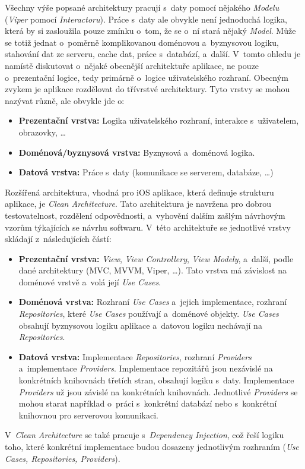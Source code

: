 Všechny výše popsané architektury pracují s~daty pomocí nějakého \emph{Modelu} (\emph{Viper} pomocí \emph{Interactoru}). Práce s~daty ale obvykle není jednoduchá logika, která by si zasloužila pouze zmínku o~tom, že se o~ní stará nějaký \emph{Model}. Může se totiž jednat o~poměrně komplikovanou doménovou a~byznysovou logiku, stahování dat ze serveru, cache dat, práce s~databází, a~další. V~tomto ohledu je namístě diskutovat o~nějaké obecnější architektuře aplikace, ne pouze o~prezentační logice, tedy primárně o~logice uživatelského rozhraní. Obecným zvykem je aplikace rozdělovat do třívrstvé architektury. Tyto vrstvy se mohou nazývat různě, ale obvykle jde o:
\begin{itemize}
\item\textbf{Prezentační vrstva:} Logika uživatelského rozhraní, interakce s~uživatelem, obrazovky, \dots
\item\textbf{Doménová/byznysová vrstva:} Byznysová a~doménová logika.
\item\textbf{Datová vrstva:} Práce s~daty (komunikace se serverem, databáze, \dots)
\end{itemize}
Rozšířená architektura, vhodná pro iOS aplikace, která definuje strukturu aplikace, je \emph{Clean Architecture}. Tato architektura je navržena pro dobrou testovatelnost, rozdělení odpovědnosti, a~vyhovění dalším zašlým návrhovým vzorům týkajících se návrhu softwaru. V~této architektuře se jednotlivé vrstvy skládají z~následujících částí:
\begin{itemize}
\item\textbf{Prezentační vrstva:} \emph{View}, \emph{View Controllery}, \emph{View Modely}, a~další, podle dané architektury (MVC, MVVM, Viper, \dots). Tato vrstva má závislost na doménové vrstvě a~volá její \emph{Use Cases}.
\item\textbf{Doménová vrstva:} Rozhraní \emph{Use Cases} a~jejich implementace, rozhraní \emph{Repositories}, které \emph{Use Cases} používají a~doménové objekty. \emph{Use Cases} obsahují byznysovou logiku aplikace a~datovou logiku nechávají na \emph{Repositories}.
\item\textbf{Datová vrstva:} Implementace \emph{Repositories}, rozhraní \emph{Providers} a~implementace \emph{Providers}. Implementace repozitářů jsou nezávislé na konkrétních knihovnách třetích stran, obsahují logiku s~daty. Implementace \emph{Providers} už jsou závislé na konkrétních knihovnách. Jednotlivé \emph{Providers} se mohou starat například o~práci s~konkrétní databází nebo s~konkrétní knihovnou pro serverovou komunikaci.
\end{itemize}
V~\emph{Clean Architecture} se také pracuje s~\emph{Dependency Injection}, což řeší logiku toho, které konkrétní implementace budou dosazeny jednotlivým rozhraním (\emph{Use Cases, Repositories, Providers}). \cite{ios-clean-arch-mvvm}

